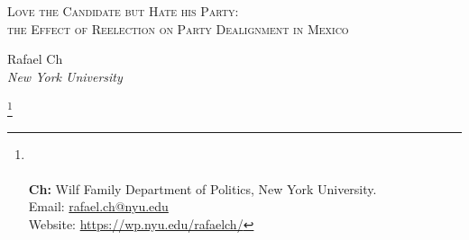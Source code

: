 \documentclass[12pt]{amsart}
\title{}
\numberwithin{equation}{section}
\theoremstyle{definition}
\theoremstyle{definition}
\theoremstyle{definition}
\begin{document}
	\vspace*{3ex minus 1ex}
	\begin{center}
		\Large \textsc{Love the Candidate but Hate his Party: \\ the Effect of Reelection on Party Dealignment in Mexico} %
	\end{center}
	
	
\date{May 24, 2021} 
\vspace*{3ex minus 1ex}
	\begin{center}
		Rafael Ch\\
		
		\textit{New York University}\\
		
	\end{center}
	 
	\thanks{%
	\\
	 \\ \textbf{Ch:} Wilf Family Department of Politics, New York University. \\ Email: \url{rafael.ch@nyu.edu}
	 \\ Website: \url{https://wp.nyu.edu/rafaelch/}}
		  
\end{document}

